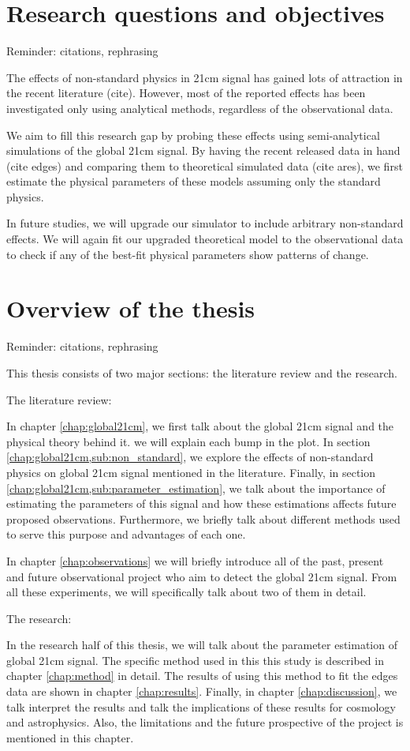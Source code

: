 \documentclass[12pt, TexShade, letterpaper]{report}
\begin{document}
\section{Research questions and objectives}
Reminder: citations, rephrasing \par
The effects of non-standard physics in 21cm signal has gained lots of attraction in the recent literature (cite). However, most of the reported effects has been investigated only using analytical methods, regardless of the observational data.\par
We aim to fill this research gap by probing these effects using semi-analytical simulations of the global 21cm signal. By having the recent released data in hand (cite edges) and comparing them to theoretical simulated data (cite ares), we first estimate the physical parameters of these models assuming only the standard physics. \par
In future studies, we will upgrade our simulator to include arbitrary non-standard effects. We will again fit our upgraded theoretical model to the observational data to check if any of the best-fit physical parameters show patterns of change.
\section{Overview of the thesis}
Reminder: citations, rephrasing\par
This thesis consists of two major sections: the literature review and the research.\par
The literature review:\par
In chapter \ref{chap:global21cm}, we first talk about the global 21cm signal and the physical theory behind it. we will explain each bump in the plot. In section \ref{chap:global21cm,sub:non_standard}, we explore the effects of non-standard physics on global 21cm signal mentioned in the literature. Finally, in section \ref{chap:global21cm,sub:parameter_estimation}, we talk about the importance of estimating the parameters of this signal and how these estimations affects future proposed observations. Furthermore, we briefly talk about different methods used to serve this purpose and advantages of each one.\par
In chapter \ref{chap:observations} we will briefly introduce all of the past, present and future observational project who aim to detect the global 21cm signal. From all these experiments, we will specifically talk about two of them in detail.\par
The research:\par
In the research half of this thesis, we will talk about the parameter estimation of global 21cm signal. The specific method used in this this study is described in chapter \ref{chap:method} in detail. The results of using this method to fit the edges data are shown in chapter \ref{chap:results}. Finally, in chapter \ref{chap:discussion}, we talk interpret the results and talk the implications of these results for cosmology and astrophysics. Also, the limitations and the future prospective of the project is mentioned in this chapter.\par
\end{document}
